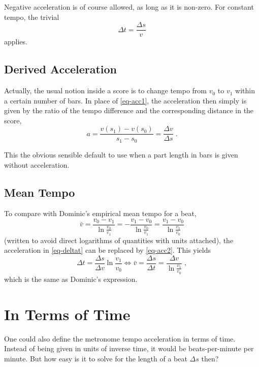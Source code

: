 \documentclass[12pt]{article}
\begin{document}
Negative acceleration is of course allowed, as long as it is
non-zero. For constant tempo, the trivial
\begin{equation}
	\Delta t = \frac{\Delta s}v
\end{equation}
applies.

\subsection*{Derived Acceleration}

Actually, the usual notion inside a score is to change tempo from $v_0$ to
$v_1$ within a certain number of bars. In place of \autoref{eq-acc1}, the
acceleration then simply is given by the ratio of the tempo difference and
the corresponding distance in the score,
\begin{equation}
\label{eq-acc2}
	a = \frac {v(s_1)-v(s_0)}{s_1 - s_0}
	= \frac{\Delta v}{\Delta s}
\;.
\end{equation}

This the obvious sensible default to use when a part length in bars is given
without acceleration.

\subsection*{Mean Tempo}

To compare with Dominic's empirical mean tempo for a beat,
\begin{equation}
\bar v = \frac{v_0 - v_1}{\ln \frac{v_0}{v_1}}
= -\frac{ v_1-v_0 }{ \ln \frac{v_0}{v_1} }
=  \frac{ v_1-v_0 }{ \ln \frac{v_1}{v_0} }
\end{equation}
(written to avoid direct logarithms of quantities with units attached),
the acceleration in \autoref{eq-deltat} can be replaced by
\autoref{eq-acc2}. This yields
\begin{equation}
	\Delta t = \frac{\Delta s}{\Delta v}
	\ln \frac {v_1}{v_0}
\Leftrightarrow
\bar v = \frac{\Delta s}{\Delta t}
= \frac{\Delta v}{\ln \frac {v_1}{v_0}}
\;,
\end{equation}
which is the same as Dominic's expression.

\section*{In Terms of Time}

One could also define the metronome tempo acceleration in terms of time.
Instead of being given in units of inverse time, it would be
beats-per-minute per minute.
But how easy is it to solve for the length of a beat $\Delta s$ then?
\end{document}
